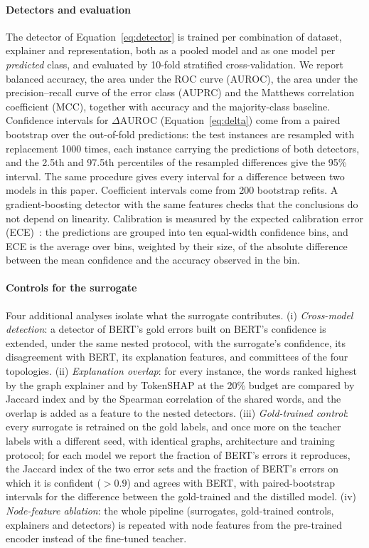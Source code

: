 \paragraph{Detectors and evaluation}
The detector of Equation~\ref{eq:detector} is trained per combination of dataset, explainer and representation, both as a pooled model and as one model per \emph{predicted} class, and evaluated by 10-fold stratified cross-validation. We report balanced accuracy, the area under the ROC curve (AUROC), the area under the precision--recall curve of the error class (AUPRC) and the Matthews correlation coefficient (MCC), together with accuracy and the majority-class baseline. Confidence intervals for \(\Delta\mathrm{AUROC}\) (Equation~\ref{eq:delta}) come from a paired bootstrap over the out-of-fold predictions: the test instances are resampled with replacement 1000 times, each instance carrying the predictions of both detectors, and the 2.5th and 97.5th percentiles of the resampled differences give the 95\% interval. The same procedure gives every interval for a difference between two models in this paper. Coefficient intervals come from 200 bootstrap refits. A gradient-boosting detector with the same features checks that the conclusions do not depend on linearity. Calibration is measured by the expected calibration error (ECE)~\cite{guo2017calibration}: the predictions are grouped into ten equal-width confidence bins, and ECE is the average over bins, weighted by their size, of the absolute difference between the mean confidence and the accuracy observed in the bin.

\paragraph{Controls for the surrogate}
Four additional analyses isolate what the surrogate contributes. (i) \emph{Cross-model detection}: a detector of BERT's gold errors built on BERT's confidence is extended, under the same nested protocol, with the surrogate's confidence, its disagreement with BERT, its explanation features, and committees of the four topologies. (ii) \emph{Explanation overlap}: for every instance, the words ranked highest by the graph explainer and by TokenSHAP at the 20\% budget are compared by Jaccard index and by the Spearman correlation of the shared words, and the overlap is added as a feature to the nested detectors. (iii) \emph{Gold-trained control}: every surrogate is retrained on the gold labels, and once more on the teacher labels with a different seed, with identical graphs, architecture and training protocol; for each model we report the fraction of BERT's errors it reproduces, the Jaccard index of the two error sets and the fraction of BERT's errors on which it is confident (\(>0.9\)) and agrees with BERT, with paired-bootstrap intervals for the difference between the gold-trained and the distilled model. (iv) \emph{Node-feature ablation}: the whole pipeline (surrogates, gold-trained controls, explainers and detectors) is repeated with node features from the pre-trained encoder instead of the fine-tuned teacher.
